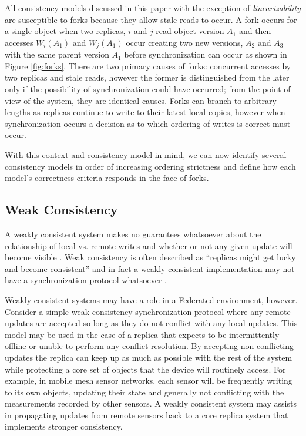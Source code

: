 \documentclass[10pt,conference,compsocconf,letterpaper]{IEEEtran}
\begin{document}
All consistency models discussed in this paper with the exception of \textit{linearizability} are susceptible to forks because they allow stale reads to occur. A fork occurs for a single object when two replicas, $i$ and $j$ read object version $A_1$ and then accesses $W_i(A_1)$ and $W_j(A_1)$ occur creating two new versions, $A_2$ and $A_3$ with the same parent version $A_1$ before synchronization can occur as shown in Figure \ref{fig:forks}. There are two primary causes of forks: concurrent accesses by two replicas and stale reads, however the former is distinguished from the later only if the possibility of synchronization could have occurred; from the point of view of the system, they are identical causes. Forks can branch to arbitrary lengths as replicas continue to write to their latest local copies, however when synchronization occurs a decision as to which ordering of writes is correct must occur.

With this context and consistency model in mind, we can now identify several consistency models in order of increasing ordering strictness and define how each model's correctness criteria responds in the face of forks.

\subsection{Weak Consistency}

A weakly consistent system makes no guarantees whatsoever about the relationship of local vs. remote writes and whether or not any given update will become visible \cite{vogels_eventually_2009}. Weak consistency is often described as ``replicas might get lucky and become consistent'' and in fact a weakly consistent implementation may not have a synchronization protocol whatsoever \cite{bermbach_consistency_2013}.

Weakly consistent systems may have a role in a Federated environment, however. Consider a simple weak consistency synchronization protocol where any remote updates are accepted so long as they do not conflict with any local updates. This model may be used in the case of a replica that expects to be intermittently offline or unable to perform any conflict resolution. By accepting non-conflicting updates the replica can keep up as much as possible with the rest of the system while protecting a core set of objects that the device will routinely access. For example, in mobile mesh sensor networks, each sensor will be frequently writing to its own objects, updating their state and generally not conflicting with the measurements recorded by other sensors. A weakly consistent system may assists in propagating updates from remote sensors back to a core replica system that implements stronger consistency.
\end{document}
